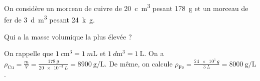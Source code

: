 

\finEntrainement




\hauteurLargeurCadreReponse		{7mm}{5cm}
\initialisationEntrainement


\debutEntrainement

On considère un morceau de cuivre de \SI{20}{c\cubic\meter} pesant \SI{178}{\gram} et un morceau de fer de \SI{3}{d\cubic \meter} pesant \SI{24}{k \gram}.

\begin{enonce}
Qui a la masse volumique la plus élevée ?
\end{enonce}


\begin{corrige}
On rappelle que $\SI{1}{c\cubic\meter}=\SI{1}{m\liter}$ et $\SI{1}{d\cubic\meter}=\SI{1}{\liter}$. On a $\rho_{\text{Cu}}=\frac{m}{V}=\frac{\SI{178}{g}}{\SI{20e-3}{L}}=\SI{8900}{\gram\per\liter}$. De même, on calcule $\rho_{\text{Fe}}=\frac{\SI{24e3}{g}}{\SI{3}{L}}=\SI{8000}{\gram\per\liter}$.
\end{corrige}


\finEntrainement



